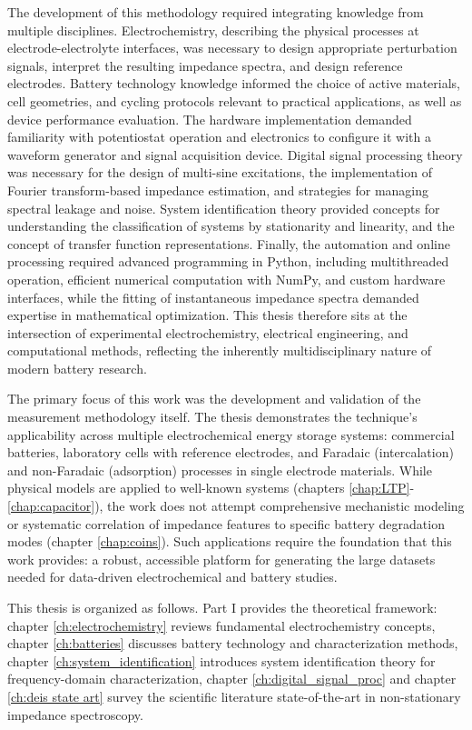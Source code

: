 The development of this methodology required integrating knowledge from multiple disciplines. Electrochemistry, describing the physical processes at electrode-electrolyte interfaces, was necessary to design appropriate perturbation signals, interpret the resulting impedance spectra, and design reference electrodes. Battery technology knowledge informed the choice of active materials, cell geometries, and cycling protocols relevant to practical applications, as well as device performance evaluation. The hardware implementation demanded familiarity with potentiostat operation and electronics to configure it with a waveform generator and signal acquisition device. Digital signal processing theory was necessary for the design of multi-sine excitations, the implementation of Fourier transform-based impedance estimation, and strategies for managing spectral leakage and noise. System identification theory provided concepts for understanding the classification of systems by stationarity and linearity, and the concept of transfer function representations. Finally, the automation and online processing required advanced programming in Python, including multithreaded operation, efficient numerical computation with NumPy, and custom hardware interfaces, while the fitting of instantaneous impedance spectra demanded expertise in mathematical optimization. This thesis therefore sits at the intersection of experimental electrochemistry, electrical engineering, and computational methods, reflecting the inherently multidisciplinary nature of modern battery research.

The primary focus of this work was the development and validation of the measurement methodology itself. The thesis demonstrates the technique's applicability across multiple electrochemical energy storage systems: commercial batteries, laboratory cells with reference electrodes, and Faradaic (intercalation) and non-Faradaic (adsorption) processes in single electrode materials. While physical models are applied to well-known systems (chapters \ref{chap:LTP}-\ref{chap:capacitor}), the work does not attempt comprehensive mechanistic modeling or systematic correlation of impedance features to specific battery degradation modes (chapter \ref{chap:coins}). Such applications require the foundation that this work provides: a robust, accessible platform for generating the large datasets needed for data-driven electrochemical and battery studies.

This thesis is organized as follows. Part I provides the theoretical framework: chapter \ref{ch:electrochemistry} reviews fundamental electrochemistry concepts, chapter \ref{ch:batteries} discusses battery technology and characterization methods, chapter \ref{ch:system_identification} introduces system identification theory for frequency-domain characterization, chapter \ref{ch:digital_signal_proc} and chapter \ref{ch:deis state art} survey the scientific literature state-of-the-art in non-stationary impedance spectroscopy.

